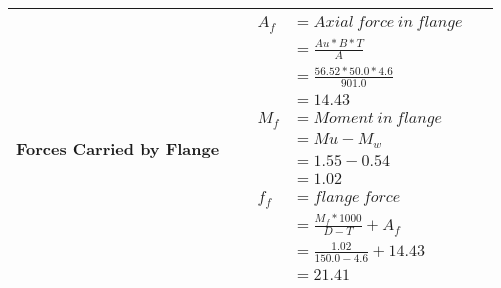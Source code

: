\documentclass{article}%
\begin{document}
\begin{longtable}{|p{4cm}|p{5cm}|p{5.5cm}|p{1.5cm}|}
\hline%
Forces Carried by Flange&&$\begin{aligned} A_f&= Axial~force~ in ~flange  \\ &= \frac{Au * B *T}{A} \\ &= \frac{56.52 * 50.0*4.6}{901.0} \\ &=14.43\\ M_f& =Moment~ in~ flange \\  & = Mu-M_w\\ &= 1.55-0.54\\ &=1.02\\  f_f& =flange~force  \\ & = \frac{M_f *1000}{D-T} + A_f \\ &= \frac{1.02}{150.0-4.6} +14.43 \\ &=21.41\end{aligned}$&\\%
\hline%
\end{longtable}

%
\end{document}
